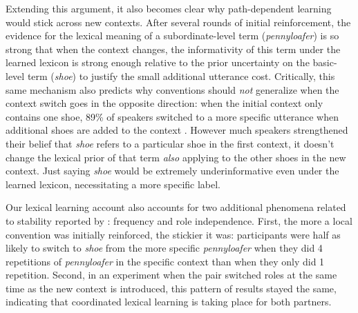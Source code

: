 \documentclass[11pt, floatsintext, jou]{apa6}
\begin{document}
Extending this argument, it also becomes clear why path-dependent learning would stick across new contexts.  After several rounds of initial reinforcement, the evidence for the lexical meaning of a subordinate-level term (\emph{pennyloafer}) is so strong that when the context changes, the informativity of this term under the learned lexicon is strong enough relative to the prior uncertainty on the basic-level term (\emph{shoe}) to justify the small additional utterance cost. Critically, this same mechanism also predicts why conventions should \emph{not} generalize when the context switch goes in the opposite direction: when the initial context only contains one shoe, 89\% of speakers switched to a more specific utterance when additional shoes are added to the context \cite{BrennanClark96_ConceptualPactsConversation}. However much speakers strengthened their belief that \emph{shoe} refers to a particular shoe in the first context, it doesn't change the lexical prior of that term \emph{also} applying to the other shoes in the new context. Just saying \emph{shoe} would be extremely underinformative even under the learned lexicon, necessitating a more specific label.

Our lexical learning account also accounts for two additional phenomena related to stability reported by : frequency and role independence. First, the more a local convention was initially reinforced, the stickier it was: participants were half as likely to switch to \emph{shoe} from the more specific \emph{pennyloafer} when they did 4 repetitions of \emph{pennyloafer} in the specific context than when they only did 1 repetition. Second, in an experiment when the pair switched roles at the same time as the new context is introduced, this pattern of results stayed the same, indicating that coordinated lexical learning is taking place for both partners. 
\end{document}

